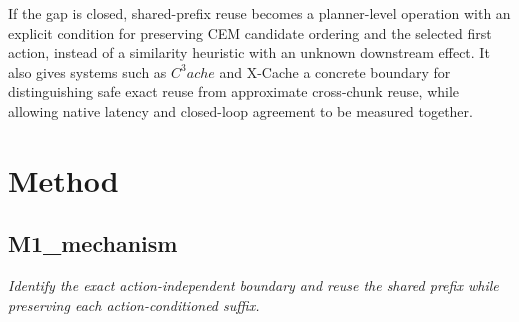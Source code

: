 \documentclass[10pt,a4paper]{article}
\begin{document}
If the gap is closed, shared-prefix reuse becomes a planner-level operation with an explicit condition for preserving CEM candidate ordering and the selected first action, instead of a similarity heuristic with an unknown downstream effect. It also gives systems such as \(C^{3}ache\) and X-Cache a concrete boundary for distinguishing safe exact reuse from approximate cross-chunk reuse, while allowing native latency and closed-loop agreement to be measured together.
\section*{Method}
\subsection*{M1\_mechanism}
\emph{Identify the exact action-independent boundary and reuse the shared prefix while preserving each action-conditioned suffix.}
\end{document}
